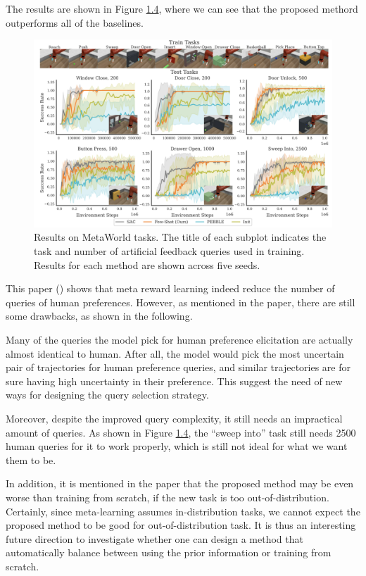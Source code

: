 \documentclass[
  letterpaper,
  DIV=11,
  numbers=noendperiod,
  oneside]{scrreprt}
\theoremstyle{remark}
\begin{document}
The results are shown in Figure \hyperref[fig:few-exp]{1.4}, where we
can see that the proposed methord outperforms all of the baselines.

\begin{figure}

{\centering \includegraphics{Figures/few-exp.png}

}

\caption{Results on MetaWorld tasks. The title of each subplot indicates
the task and number of artificial feedback queries used in training.
Results for each method are shown across five seeds.}

\end{figure}%

This paper ()
shows that meta reward learning indeed reduce the number of queries of
human preferences. However, as mentioned in the paper, there are still
some drawbacks, as shown in the following.

Many of the queries the model pick for human preference elicitation are
actually almost identical to human. After all, the model would pick the
most uncertain pair of trajectories for human preference queries, and
similar trajectories are for sure having high uncertainty in their
preference. This suggest the need of new ways for designing the query
selection strategy.

Moreover, despite the improved query complexity, it still needs an
impractical amount of queries. As shown in Figure
\hyperref[fig:few-exp]{1.4}, the ``sweep into'' task still needs 2500
human queries for it to work properly, which is still not ideal for what
we want them to be.

In addition, it is mentioned in the paper that the proposed method may
be even worse than training from scratch, if the new task is too
out-of-distribution. Certainly, since meta-learning assumes
in-distribution tasks, we cannot expect the proposed method to be good
for out-of-distribution task. It is thus an interesting future direction
to investigate whether one can design a method that automatically
balance between using the prior information or training from scratch.
\end{document}
